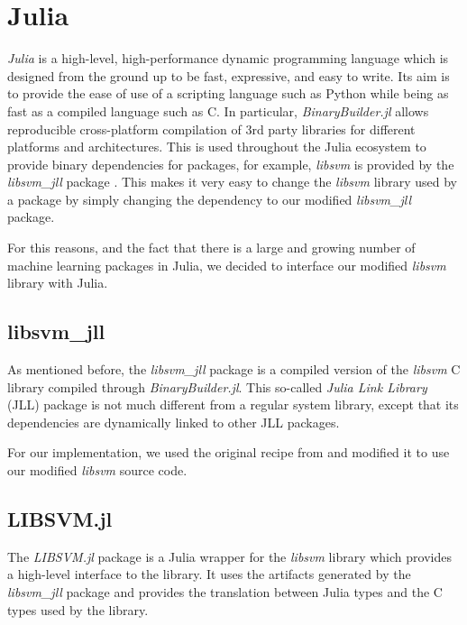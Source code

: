 \section{Julia}

\emph{Julia} \cite{bezanson2017julia} is a high-level, high-performance dynamic programming language
which is designed from the ground up to be fast, expressive, and easy to write. Its aim is to provide
the ease of use of a scripting language such as Python while being as fast as a compiled language
such as C. In particular, \emph{BinaryBuilder.jl} \cite{JLLPackagesBinaryBuilder} allows reproducible
cross-platform compilation of 3rd party libraries for different platforms and architectures.
This is used throughout the Julia ecosystem to provide binary dependencies for packages,
for example, \emph{libsvm} is provided by the \emph{libsvm\_jll} package \cite{LibsvmJllJl2022}.
This makes it very easy to change the \emph{libsvm} library used by a package by simply changing
the dependency to our modified \emph{libsvm\_jll} package.

For this reasons, and the fact that there is a large and growing number of machine learning
packages in Julia, we decided to interface our modified \emph{libsvm} library with Julia.

\subsection{libsvm\_jll}

As mentioned before, the \emph{libsvm\_jll} package is a compiled version of the \emph{libsvm} C library
compiled through \emph{BinaryBuilder.jl}. This so-called \emph{Julia Link Library} (JLL) package
is not much different from a regular system library, except that its dependencies are dynamically
linked to other JLL packages.

For our implementation, we used the original recipe from \textcite{LibsvmJllJl2022} and modified it
to use our modified \emph{libsvm} source code.

\subsection{LIBSVM.jl}

The \emph{LIBSVM.jl} package \cite{LIBSVMJl2023} is a Julia wrapper for the \emph{libsvm} library which
provides a high-level interface to the library. It uses the artifacts generated by the \emph{libsvm\_jll}
package and provides the translation between Julia types and the C types used by the library.

